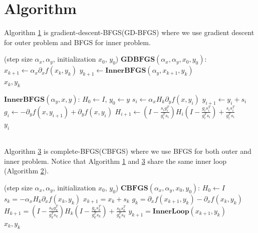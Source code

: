 \documentclass{article}
\begin{document}
\section{Algorithm}
Algorithm \hyperref[GDBFGS]{1} is gradient-descent-BFGS(GD-BFGS) where we use gradient descent for outer problem and BFGS for inner problem.
\begin{algorithm}
    \caption{Gradient-descent-BFGS}
    \label{GDBFGS}
    \begin{algorithmic}
        \State (step size $\alpha_x, \alpha_y$, initialization $x_0$, $y_0$)
        \State $\textbf{GDBFGS}(\alpha_x, \alpha_y, x_0, y_0)$:
        \State $x_{k+1} \gets \alpha_x \partial_xf(x_k, y_k)$
        \State $y_{k+1} \gets \textbf{InnerBFGS} (\alpha_y, x_{k+1}, y_k)$
        \EndFor\\
        \Return $x_k, y_k$
    \end{algorithmic}
\end{algorithm}
\begin{algorithm}
    \caption{InnerBFGS}
    \label{InnerBFGS}
    \begin{algorithmic}
        \State $\textbf{InnerBFGS}(\alpha_y, x, y)$:
        \State $H_0 \gets I$, $y_0 \gets y$
            \State $s_i \gets \alpha_x H_k \partial_y f(x, y_i)$
            \State $y_{i+1} \gets y_i + s_i$
            \State $g_i \gets - \partial_y f(x, y_{i+1}) + \partial_y f(x, y_i)$
            \State $H_{i+1} \gets (I - \frac{s_i g_i^T}{g_i^T s_i})H_i(I - \frac{g_i s_i^T}{g_i^T s_i}) + \frac{s_is_i^T}{g_i^T s_i}$
        \EndFor\\
        \Return $y_i$
    \end{algorithmic}
\end{algorithm}
\\Algorithm \hyperref[CBFGS]{3} is complete-BFGS(CBFGS) where we use BFGS for both outer and inner problem. Notice that Algorithm \hyperref[GDBFGS]{1} and \hyperref[CBFGS]{3} share the same inner loop (Algorithm \hyperref[InnerBFGS]{2}).
\begin{algorithm}
    \caption{Complete-BFGS}
    \label{CBFGS}
    \begin{algorithmic}
        \State (step size $\alpha_x, \alpha_y$, initialization $x_0$, $y_0$)
        \State $\textbf{CBFGS}(\alpha_x, \alpha_y, x_0, y_0)$:
        \State $H_0 \gets I$
            \State $s_k = - \alpha_x H_k \partial_x f(x_k, y_k)$
            \State $x_{k+1} = x_k + s_k$
            \State $g_k = \partial_x f(x_{k+1}, y_k) - \partial_x f(x_k, y_k)$
            \State $H_{k+1} = (I - \frac{s_k g_k^T}{g_k^T s_k})H_k(I - \frac{g_k s_k^T}{g_k^T s_k}) + \frac{s_ks_k^T}{g_k^T s_k}$
            \State $y_{k+1} = \textbf{InnerLoop} (x_{k+1}, y_k)$
        \EndFor\\
        \Return $x_k,y_k$
    \end{algorithmic}
\end{algorithm}
\end{document}
